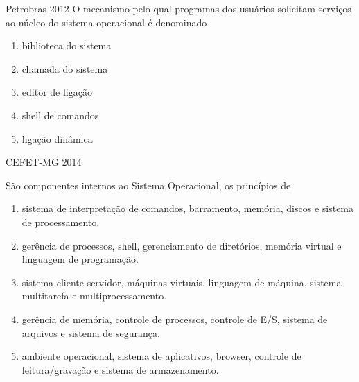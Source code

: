 \documentclass[aspectratio=169,
				xcolor=table]{beamer}
\begin{document}
	\begin{frame}{Petrobras 2012}
		O mecanismo pelo qual programas dos usuários solicitam serviços ao núcleo do sistema operacional é denominado
		\begin{enumerate}[a]
			\item biblioteca do sistema
			\item \alert{chamada do sistema}
			\item editor de ligação 
			\item shell de comandos
			\item ligação dinâmica
		\end{enumerate}
	\end{frame}

	\begin{frame}{CEFET-MG 2014}
		
		São componentes internos ao Sistema Operacional, os princípios de
		\begin{enumerate}[a]
			\item sistema de interpretação de comandos, barramento, memória, discos e sistema de processamento.

			\item gerência de processos, shell, gerenciamento de diretórios, memória virtual e linguagem de programação.

			\item sistema cliente-servidor, máquinas virtuais, linguagem de máquina, sistema multitarefa e multiprocessamento.

			\item gerência de memória, controle de processos, controle de E/S, sistema de arquivos e sistema de segurança.

			\item ambiente operacional, sistema de aplicativos, browser, controle de leitura/gravação e sistema de armazenamento.

		\end{enumerate}
	\end{frame}
\end{document}
